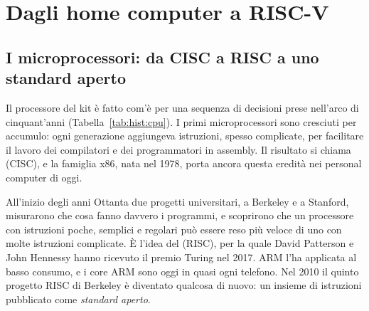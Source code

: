 \section{Dagli home computer a RISC-V}

\subsection{I microprocessori: da CISC a RISC a uno standard aperto}

Il processore del kit \prg è fatto com'è per una sequenza di decisioni prese
nell'arco di cinquant'anni (Tabella~\ref{tab:hist:cpu}). I primi
microprocessori sono cresciuti per accumulo: ogni generazione aggiungeva
istruzioni, spesso complicate, per facilitare il lavoro dei compilatori e dei
programmatori in assembly. Il risultato si chiama  (CISC), e la famiglia x86, nata nel 1978, porta ancora questa eredità
nei personal computer di oggi.

All'inizio degli anni Ottanta due progetti universitari, a Berkeley e a
Stanford, misurarono che cosa fanno davvero i programmi, e scoprirono che un
processore con istruzioni poche, semplici e regolari può essere reso più veloce
di uno con molte istruzioni complicate. È l'idea del  (RISC), per la quale David Patterson e John Hennessy hanno
ricevuto il premio Turing nel 2017. ARM l'ha applicata al basso consumo, e i
core ARM sono oggi in quasi ogni telefono. Nel 2010 il quinto progetto RISC di
Berkeley è diventato qualcosa di nuovo: un insieme di istruzioni pubblicato
come \emph{standard aperto}.

